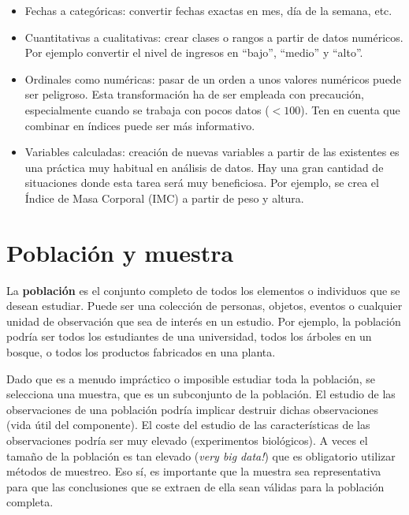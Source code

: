 \documentclass[
  letterpaper,
  DIV=11,
  numbers=noendperiod]{scrreprt}
\providecommand{\tightlist}{%
  \setlength{\itemsep}{0pt}\setlength{\parskip}{0pt}}\usepackage{longtable,booktabs,array}
\begin{document}
\begin{itemize}
\tightlist
\item
  Fechas a categóricas: convertir fechas exactas en mes, día de la
  semana, etc.
\item
  Cuantitativas a cualitativas: crear clases o rangos a partir de datos
  numéricos. Por ejemplo convertir el nivel de ingresos en ``bajo'',
  ``medio'' y ``alto''.
\item
  Ordinales como numéricas: pasar de un orden a unos valores numéricos
  puede ser peligroso. Esta transformación ha de ser empleada con
  precaución, especialmente cuando se trabaja con pocos datos
  (\(<100\)). Ten en cuenta que combinar en índices puede ser más
  informativo.
\item
  Variables calculadas: creación de nuevas variables a partir de las
  existentes es una práctica muy habitual en análisis de datos. Hay una
  gran cantidad de situaciones donde esta tarea será muy beneficiosa.
  Por ejemplo, se crea el Índice de Masa Corporal (IMC) a partir de peso
  y altura.
\end{itemize}

\hypertarget{poblaciuxf3n-y-muestra}{%
\section{Población y muestra}\label{poblaciuxf3n-y-muestra}}

La \textbf{población} es el conjunto completo de todos los elementos o
individuos que se desean estudiar. Puede ser una colección de personas,
objetos, eventos o cualquier unidad de observación que sea de interés en
un estudio. Por ejemplo, la población podría ser todos los estudiantes
de una universidad, todos los árboles en un bosque, o todos los
productos fabricados en una planta.

Dado que es a menudo impráctico o imposible estudiar toda la población,
se selecciona una muestra, que es un subconjunto de la población. El
estudio de las observaciones de una población podría implicar destruir
dichas observaciones (vida útil del componente). El coste del estudio de
las características de las observaciones podría ser muy elevado
(experimentos biológicos). A veces el tamaño de la población es tan
elevado (\emph{very big data!}) que es obligatorio utilizar métodos de
muestreo. Eso sí, es importante que la muestra sea representativa para
que las conclusiones que se extraen de ella sean válidas para la
población completa.
\end{document}
